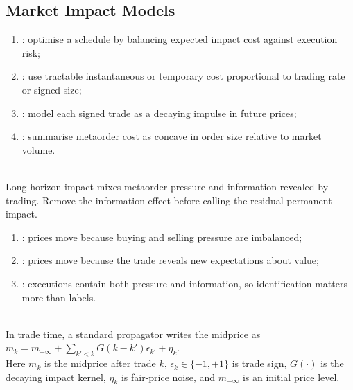 \subsection{Market Impact Models}

\begin{taxonomy} 
\begin{enumerate}[label=\roman*.]
\setlength{\itemsep}{0pt}
\item {}: optimise a schedule by balancing expected impact cost against execution risk;
\item {}: use tractable instantaneous or temporary cost proportional to trading rate or signed size;
\item {}: model each signed trade as a decaying impulse in future prices;
\item {}: summarise metaorder cost as concave in order size relative to market volume.
\end{enumerate}
\end{taxonomy}

\begin{principle} \\
Long-horizon impact mixes metaorder pressure and information revealed by trading. Remove the information effect before calling the residual permanent impact.
\end{principle}

\begin{taxonomy} 
\begin{enumerate}[label=\roman*.]
\setlength{\itemsep}{0pt}
\item {}: prices move because buying and selling pressure are imbalanced;
\item {}: prices move because the trade reveals new expectations about value;
\item {}: executions contain both pressure and information, so identification matters more than labels.
\end{enumerate}
\end{taxonomy}

\begin{model} \\
In trade time, a standard propagator writes the midprice as $m_k=m_{-\infty}+\sum\limits_{k'<k}G(k-k')\epsilon_{k'}+\eta_k$.\\
Here $m_k$ is the midprice after trade $k$, $\epsilon_k\in\{-1,+1\}$ is trade sign, $G(\cdot)$ is the decaying impact kernel, $\eta_k$ is fair-price noise, and $m_{-\infty}$ is an initial price level.
\end{model}

